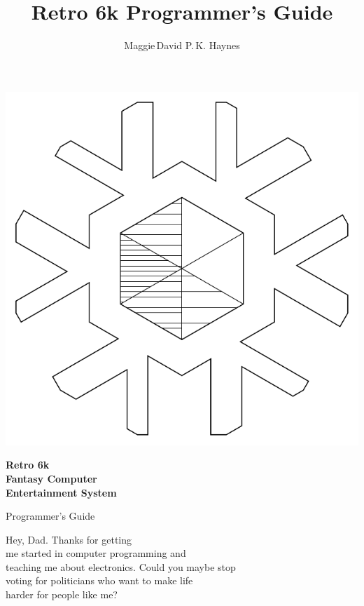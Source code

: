 \documentclass[12pt]{{memoir}}
\begin{document}
\title{Retro 6k Programmer's Guide}
\author{Maggie\,David P.\,K. Haynes}
\pagestyle{empty}
\begin{center}
\includegraphics{logolineart}

{\sffamily\bfseries\Huge{}Retro 6k\\Fantasy Computer\\Entertainment System

Programmer's Guide\par}
{\sffamily\bfseries\large\theauthor\par}
\end{center}
\cleartoverso
{}
\begin{center}
\noindent{}Hey, Dad. Thanks for getting \\
me started in computer programming and \\
teaching me about electronics. Could you maybe stop \\
voting for politicians who want to make life \\
harder for people like me?\par
\end{center}
\end{document}
